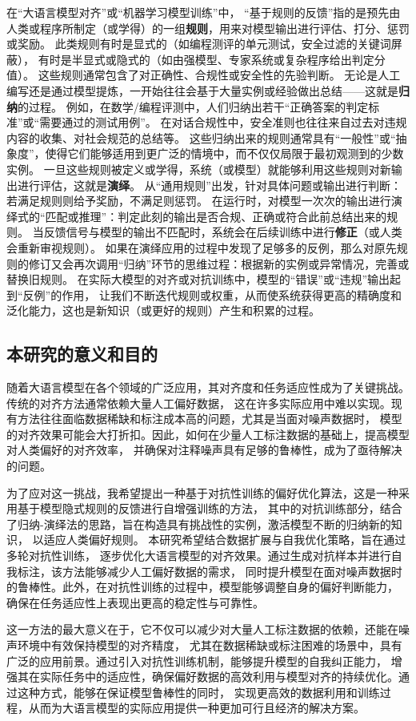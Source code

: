 在“大语言模型对齐”或“机器学习模型训练”中，
“基于规则的反馈”指的是预先由人类或程序所制定（或学得）的一组\textbf{规则}，用来对模型输出进行评估、打分、惩罚或奖励。
此类规则有时是显式的（如编程测评的单元测试，安全过滤的关键词屏蔽），
有时是半显式或隐式的（如由强模型、专家系统或复杂程序给出判定分值）。
这些规则通常包含了对正确性、合规性或安全性的先验判断。
无论是人工编写还是通过模型提炼，一开始往往会基于大量实例或经验做出总结——这就是\textbf{归纳}的过程。
例如，在数学/编程评测中，人们归纳出若干“正确答案的判定标准”或“需要通过的测试用例”。
在对话合规性中，安全准则也往往来自过去对违规内容的收集、对社会规范的总结等。
这些归纳出来的规则通常具有“一般性”或“抽象度”，使得它们能够适用到更广泛的情境中，而不仅仅局限于最初观测到的少数实例。
一旦这些规则被定义或学得，系统（或模型）就能够利用这些规则对新输出进行评估，这就是\textbf{演绎}。
从“通用规则”出发，针对具体问题或输出进行判断：若满足规则则给予奖励，不满足则惩罚。
在运行时，对模型一次次的输出进行演绎式的“匹配或推理”：判定此刻的输出是否合规、正确或符合此前总结出来的规则。
当反馈信号与模型的输出不匹配时，系统会在后续训练中进行\textbf{修正}（或人类会重新审视规则）。
如果在演绎应用的过程中发现了足够多的反例，那么对原先规则的修订又会再次调用“归纳”环节的思维过程：根据新的实例或异常情况，完善或替换旧规则。
在实际大模型的对齐或对抗训练中，模型的“错误”或“违规”输出起到“反例”的作用，
让我们不断迭代规则或权重，从而使系统获得更高的精确度和泛化能力，这也是新知识（或更好的规则）产生和积累的过程。

\subsection{本研究的意义和目的}

随着大语言模型在各个领域的广泛应用，其对齐度和任务适应性成为了关键挑战。传统的对齐方法通常依赖大量人工偏好数据，
这在许多实际应用中难以实现。现有方法往往面临数据稀缺和标注成本高的问题，尤其是当面对噪声数据时，
模型的对齐效果可能会大打折扣。因此，如何在少量人工标注数据的基础上，提高模型对人类偏好的对齐效率，
并确保对注释噪声具有足够的鲁棒性，成为了亟待解决的问题。

为了应对这一挑战，我希望提出一种基于对抗性训练的偏好优化算法，这是一种采用基于模型隐式规则的反馈进行自增强训练的方法，
其中的对抗训练部分，结合了归纳-演绎法的思路，旨在构造具有挑战性的实例，激活模型不断的归纳新的知识，
以适应人类偏好规则。
本研究希望结合数据扩展与自我优化策略，旨在通过多轮对抗性训练，
逐步优化大语言模型的对齐效果。通过生成对抗样本并进行自我标注，该方法能够减少人工偏好数据的需求，
同时提升模型在面对噪声数据时的鲁棒性。此外，在对抗性训练的过程中，模型能够调整自身的偏好判断能力，
确保在任务适应性上表现出更高的稳定性与可靠性。

这一方法的最大意义在于，它不仅可以减少对大量人工标注数据的依赖，还能在噪声环境中有效保持模型的对齐精度，
尤其在数据稀缺或标注困难的场景中，具有广泛的应用前景。通过引入对抗性训练机制，能够提升模型的自我纠正能力，
增强其在实际任务中的适应性，确保偏好数据的高效利用与模型对齐的持续优化。通过这种方式，能够在保证模型鲁棒性的同时，
实现更高效的数据利用和训练过程，从而为大语言模型的实际应用提供一种更加可行且经济的解决方案。